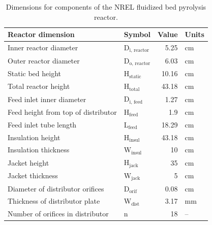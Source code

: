 \begin{table}[H]
    \centering
    \caption{Dimensions for components of the NREL fluidized bed pyrolysis reactor.}
    \label{tab:dimensions}
    \begin{tabular}{llrl}
        \toprule
        Reactor dimension & Symbol & Value & Units \\
        \midrule
        Inner reactor diameter              & D$_{\textrm{i, reactor}}$  & 5.25  & cm \\
        Outer reactor diameter              & D$_{\textrm{o, reactor}}$  & 6.03  & cm \\
        Static bed height                   & H$_{\textrm{static}}$      & 10.16 & cm \\
        Total reactor height                & H$_{\textrm{total}}$       & 43.18 & cm \\
        Feed inlet inner diameter           & D$_{\textrm{i, feed}}$     & 1.27  & cm \\
        Feed height from top of distributor & H$_{\textrm{feed}}$        & 1.9   & cm \\
        Feed inlet tube length              & L$_{\textrm{feed}}$        & 18.29 & cm \\
        Insulation height                   & H$_{\textrm{insul}}$       & 43.18 & cm \\
        Insulation thickness                & W$_{\textrm{insul}}$       & 10    & cm \\
        Jacket height                       & H$_{\textrm{jack}}$        & 35    & cm \\
        Jacket thickness                    & W$_{\textrm{jack}}$        & 5     & cm \\
        Diameter of distributor orifices    & D$_{\textrm{orif}}$        & 0.08  & cm \\
        Thickness of distributor plate      & W$_{\textrm{dist}}$        & 3.17  & mm \\
        Number of orifices in distributor   & n                          & 18    & -- \\
        \bottomrule
    \end{tabular}
\end{table}

